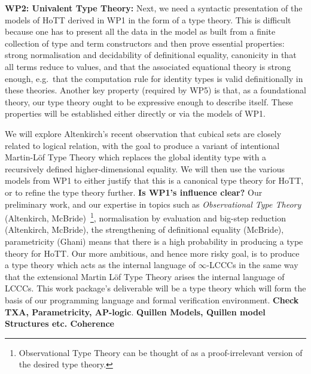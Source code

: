 \documentclass[a4paper,11pt]{article}
\begin{document}
{\bf WP2: Univalent Type Theory:} Next, we need a syntactic
presentation of the models of HoTT derived in WP1 in the form of a
type theory. This is difficult because one has to present all the data
in the model as built from a finite collection of type and term
constructors and then prove essential properties: strong normalisation
and decidability of definitional equality, canonicity in that all
terms reduce to values, and that the associated equational theory is
strong enough, e.g.\ that the computation rule for identity types is
valid definitionally in these theories. Another key property (required
by WP5) is that, as a foundational theory, our type theory ought to be
expressive enough to describe itself. These properties will be established
either directly or via the models of WP1.


We will explore Altenkirch's recent observation that cubical sets are closely related to logical relation, 
with the goal to produce a variant of intentional
Martin-L\"of Type Theory which replaces the global identity type with
a recursively defined higher-dimensional equality. We will then use
the various models from WP1 to either justify that this is a canonical
type theory for HoTT, or to refine the type theory further. {\bf Is
  WP1's influence clear?} Our preliminary work, and our expertise in
topics such as {\em Observational Type Theory} (Altenkirch,
McBride)~\footnote{ Observational Type Theory can be thought of as a
  proof-irrelevant version of the desired type theory.},
normalisation by evaluation and big-step reduction (Altenkirch,
McBride), the strengthening of definitional equality (McBride),
parametricity (Ghani) means that there is a high probability in
producing a type theory for HoTT. Our more ambitious, and hence more
risky goal, is to produce a type theory which acts as the internal
language of $\infty$-LCCCs in the same way that the extensional Martin
L\"of Type Theory arises the internal language of LCCCs.  This
work package's deliverable will be a type theory which will form the
basis of our programming language and formal verification
environment. {\bf Check TXA, Parametricity, AP-logic}.  {\bf Quillen
  Models, Quillen model Structures etc. Coherence}
\end{document}

